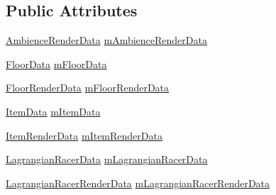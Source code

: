 \subsection*{Public Attributes}
\begin{DoxyCompactItemize}
\item 
\hyperlink{class_ambience_render_data}{Ambience\-Render\-Data} \hyperlink{class_world_data_aade26928ad447ef5d3be29828fdd5e75}{m\-Ambience\-Render\-Data}
\item 
\hyperlink{class_floor_data}{Floor\-Data} \hyperlink{class_world_data_a23bdc6fa958c4dca89c6fa60c82e6302}{m\-Floor\-Data}
\item 
\hyperlink{class_floor_render_data}{Floor\-Render\-Data} \hyperlink{class_world_data_a4011d480f1f2c6d7834c0c87b638148f}{m\-Floor\-Render\-Data}
\item 
\hyperlink{class_item_data}{Item\-Data} \hyperlink{class_world_data_ac67d786167b4c19c0f80482039a54bda}{m\-Item\-Data}
\item 
\hyperlink{class_item_render_data}{Item\-Render\-Data} \hyperlink{class_world_data_a5b7cd9727ecd755551f26a5e5ae00401}{m\-Item\-Render\-Data}
\item 
\hyperlink{class_lagrangian_racer_data}{Lagrangian\-Racer\-Data} \hyperlink{class_world_data_af67bbeb4b60eed38f04a58a79e4f1f26}{m\-Lagrangian\-Racer\-Data}
\item 
\hyperlink{class_lagrangian_racer_render_data}{Lagrangian\-Racer\-Render\-Data} \hyperlink{class_world_data_ae5db22573828a345da184d14de38cf6e}{m\-Lagrangian\-Racer\-Render\-Data}
\end{DoxyCompactItemize}


